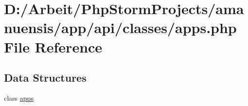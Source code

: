 \hypertarget{a00052}{}\section{D\+:/\+Arbeit/\+Php\+Storm\+Projects/amanuensis/app/api/classes/apps.php File Reference}
\label{a00052}
\subsection*{Data Structures}
\begin{DoxyCompactItemize}
\item 
class \hyperlink{a00012}{apps}
\end{DoxyCompactItemize}
